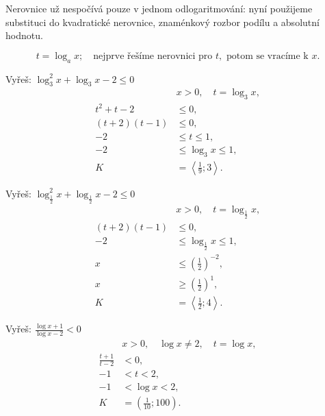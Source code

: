 \documentclass[11pt,a4paper]{article}
\begin{document}
Nerovnice už nespočívá pouze v jednom odlogaritmování: nyní použijeme substituci do kvadratické nerovnice, znaménkový rozbor podílu a absolutní hodnotu.

\[
t=\log_a x;\quad\text{nejprve řešíme nerovnici pro }t,\text{ potom se vracíme k }x.
\]


\begin{prikladReseniBox}[title={Příklad 1}]
Vyřeš: $\displaystyle \log_3^2x+\log_3x-2\le0$
\tcblower
\[
\begin{aligned}
&x>0,\quad t=\log_3 x,\\
t^2+t-2&\le0,\\
(t+2)(t-1)&\le0,\\
-2&\le t\le1,\\
-2&\le\log_3x\le1,\\
K&=\left\langle\frac19;3\right\rangle.
\end{aligned}
\]
\end{prikladReseniBox}
\begin{prikladReseniBox}[title={Příklad 2}]
Vyřeš: $\displaystyle \log_{\frac12}^2x+\log_{\frac12}x-2\le0$
\tcblower
\[
\begin{aligned}
&x>0,\quad t=\log_{\frac12}x,\\
(t+2)(t-1)&\le0,\\
-2&\le\log_{\frac12}x\le1,\\
x&\le\left(\frac12\right)^{-2},\\
x&\ge\left(\frac12\right)^1,\\
K&=\left\langle\frac12;4\right\rangle.
\end{aligned}
\]
\end{prikladReseniBox}
\begin{prikladReseniBox}[title={Příklad 3}]
Vyřeš: $\displaystyle \frac{\log x+1}{\log x-2}<0$
\tcblower
\[
\begin{aligned}
&x>0,\quad\log x\ne2,\quad t=\log x,\\
\frac{t+1}{t-2}&<0,\\
-1&<t<2,\\
-1&<\log x<2,\\
K&=\left(\frac1{10};100\right).
\end{aligned}
\]
\end{prikladReseniBox}
\end{document}
